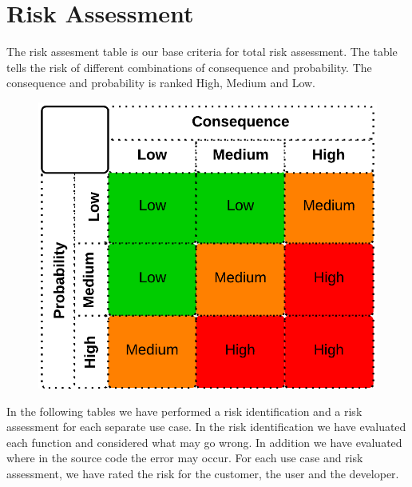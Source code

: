 \chapter{Risk Assessment}

	The risk assesment table is our base criteria for total risk assessment. The table tells 
	the risk of different combinations of consequence and probability. The consequence and 
	probability is ranked High, Medium and Low. 

		\begin{figure}[H]
			\includegraphics[scale=0.3]{pics/risk.png}
		\end{figure}

	In the following tables we have performed a risk identification and a risk assessment for 
	each separate use case. In the risk identification we have evaluated each function and 
	considered what may go wrong. In addition we have evaluated where in the source code the 
	error may occur. For each use case and risk assessment, we have rated the risk for the customer, 
	the user and the developer. 

	\clearpage


